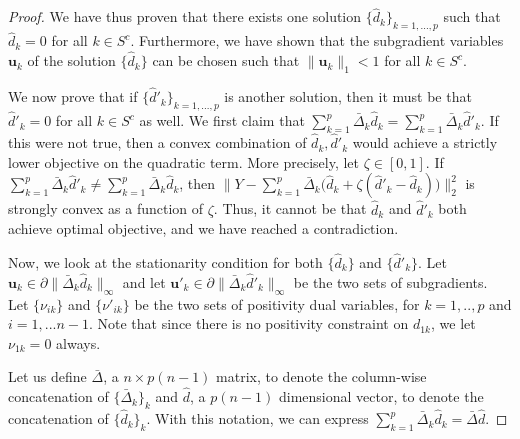 \begin{proof}
We have thus proven that there exists one solution $\{ \hat{d}_k
\}_{k=1,...,p}$ such that $\hat{d}_k = 0$ for all $k \in
S^c$. Furthermore, we have shown that the subgradient variables
$\mathbf{u}_k$ of the solution $\{ \hat{d}_k \}$ can be chosen such
that $\| \mathbf{u}_k \|_1 < 1$ for all $k \in S^c$.  

We now prove that if $\{ \hat{d}'_k \}_{k = 1,..., p}$ is another
solution, then it must be that $\hat{d}'_k = 0$ for all $k \in S^c$ as
well.  We first claim that $\sum_{k=1}^p \bar{\Delta}_k \hat{d}_k =
\sum_{k=1}^p \bar{\Delta}_k \hat{d}'_k$. If this were not true, then a
convex combination of $\hat{d}_k, \hat{d}'_k$ would achieve a strictly
lower objective on the quadratic term. More precisely, let $\zeta \in
[0,1]$. If $\sum_{k=1}^p \bar{\Delta}_k \hat{d}'_k \neq \sum_{k=1}^p
\bar{\Delta}_k \hat{d}_k$, then $\| Y - \sum_{k=1}^p \bar{\Delta}_k
\big( \hat{d}_k + \zeta ( \hat{d}'_k - \hat{d}_k) \big) \|_2^2$ is
strongly convex as a function of $\zeta$. Thus, it cannot be that
$\hat{d}_k$ and $\hat{d}'_k$ both achieve optimal objective, and we
have reached a contradiction.

Now, we look at the stationarity condition for both $\{ \hat{d}_k \}$
and $\{ \hat{d}'_k \}$. Let $\mathbf{u}_k \in \partial \|
\bar{\Delta}_k \hat{d}_k \|_\infty$ and let $\mathbf{u}'_k
\in \partial \| \bar{\Delta}_k \hat{d}'_k \|_\infty$ be the two sets
of subgradients. Let $\{ \nu_{ik} \}$ and $\{
\nu'_{ik} \}$ be the two sets of positivity dual
variables, for $k=1,..,p$ and $i=1,...n-1$.  Note that since there is no positivity constraint on
$d_{1k}$, we let $\nu_{1k} = 0$ always.

Let us define $\bar{\Delta}$, a $n \times p(n-1)$ matrix, to denote the column-wise concatenation of $\{ \bar{\Delta}_k \}_k$ and $\hat{d}$, a $p(n-1)$ dimensional vector, to denote the concatenation of $\{ \hat{d}_k \}_k$. With this notation, we can express $\sum_{k=1}^p \bar{\Delta}_k \hat{d}_k = \bar{\Delta} \hat{d}$.


\end{proof}
